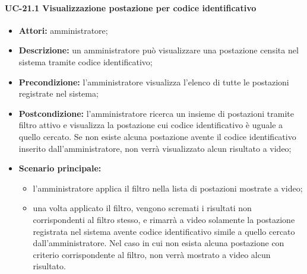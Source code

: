 \paragraph{UC-21.1 Visualizzazione postazione per codice identificativo}
\begin{itemize}
    \item \textbf{Attori:} amministratore;
    \item \textbf{Descrizione:} un amministratore pu\`{o} visualizzare una postazione censita nel sistema tramite codice identificativo;
    \item \textbf{Precondizione:} l'amministratore visualizza l'elenco di tutte le postazioni registrate nel sistema;
    \item \textbf{Postcondizione:} l'amministratore ricerca un insieme di postazioni tramite filtro attivo e visualizza la postazione cui codice identificativo è uguale a quello cercato. Se non esiste alcuna postazione avente il codice identificativo inserito dall'amministratore, non verrà visualizzato alcun risultato a video;
    \item \textbf{Scenario principale:}
    \begin{itemize}
        \item l'amministratore applica il filtro nella lista di postazioni mostrate a video;
        \item una volta applicato il filtro, vengono scremati i risultati non corrispondenti al filtro stesso, e rimarrà a video solamente la postazione registrata nel sistema avente codice identificativo simile a quello cercato dall'amministratore. Nel caso in cui non esista alcuna postazione con criterio corrispondente al filtro, non verrà mostrato a video alcun risultato.
    \end{itemize}
\end{itemize}


